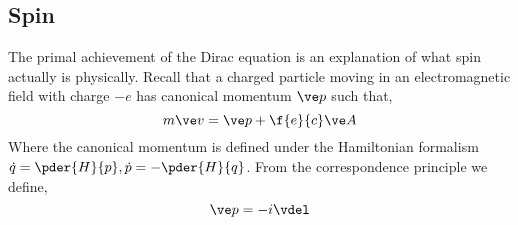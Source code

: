 \documentclass{article}
\begin{document}
\subsection{Spin}

The primal achievement of the Dirac equation is an explanation of what spin actually is physically. Recall that a charged particle moving in an electromagnetic field with charge $- e$ has canonical momentum $\ve p$ such that,
\[ m \ve v = \ve p + \f{e}{c} \ve A \]
Where the canonical momentum is defined under the Hamiltonian formalism $\dot q = \pder{H}{p}, \dot p = - \pder{H}{q}$. From the correspondence principle we define,
\[ \ve p = - i \vdel \]
\end{document}

